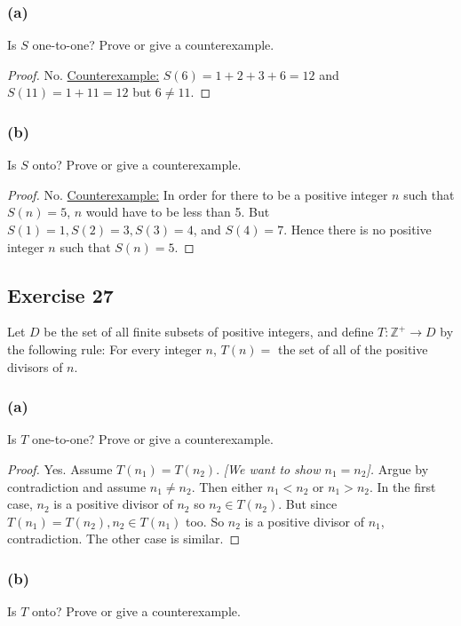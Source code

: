 \documentclass[14pt]{extarticle}
\newcommand{\Z}{\mathbb{Z}}
\begin{document}
\subsubsection{(a)}
Is $S$ one-to-one? Prove or give a counterexample.

\begin{proof}
No. \underline{Counterexample:} \(S(6) = 1 + 2 + 3 + 6 = 12\) and \(S(11) = 1 + 11 = 12\) but \(6 \neq 11\).
\end{proof}

\subsubsection{(b)}
Is $S$ onto? Prove or give a counterexample.

\begin{proof}
No. \underline{Counterexample:} In order for there to be a positive integer $n$ such that $S(n) = 5$, $n$ would have 
to be less than 5. But \(S(1) = 1, S(2) = 3, S(3) = 4\), and \(S(4) = 7\). Hence there is no positive integer $n$ 
such that \(S(n) = 5\).
\end{proof}

\subsection{Exercise 27}
Let $D$ be the set of all finite subsets of positive integers, and define \(T: \Z^+ \to D\) by the following 
rule: For every integer $n$, $T(n) =$ the set of all of the positive divisors of $n$.

\subsubsection{(a)}
Is $T$ one-to-one? Prove or give a counterexample.

\begin{proof}
Yes. Assume \(T(n_1) = T(n_2)\). {\it [We want to show \(n_1 = n_2\)].} Argue by contradiction and assume 
\(n_1 \neq n_2\). Then either \(n_1 < n_2\) or \(n_1 > n_2\). In the first case, $n_2$ is a positive divisor of 
$n_2$ so \(n_2 \in T(n_2)\). But since \(T(n_1) = T(n_2), n_2 \in T(n_1)\) too. So $n_2$ is a positive divisor of 
$n_1$, contradiction. The other case is similar.
\end{proof}

\subsubsection{(b)}
Is $T$ onto? Prove or give a counterexample.
\end{document}
